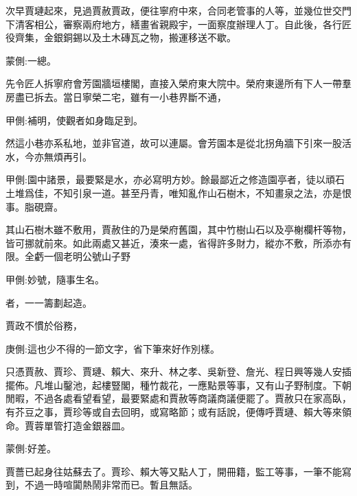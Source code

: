 \begin{parag}
    次早賈璉起來，見過賈赦賈政，便往寧府中來，合同老管事的人等，並幾位世交門下清客相公，審察兩府地方，繕畫省親殿宇，一面察度辦理人丁。自此後，各行匠役齊集，金銀銅錫以及土木磚瓦之物，搬運移送不歇。\begin{note}蒙側:一總。\end{note}先令匠人拆寧府會芳園牆垣樓閣，直接入榮府東大院中。榮府東邊所有下人一帶羣房盡已拆去。當日寧榮二宅，雖有一小巷界斷不通，\begin{note}甲側:補明，使觀者如身臨足到。\end{note}然這小巷亦系私地，並非官道，故可以連屬。會芳園本是從北拐角牆下引來一股活水，今亦無煩再引。\begin{note}甲側:園中諸景，最要緊是水，亦必寫明方妙。餘最鄙近之修造園亭者，徒以頑石土堆爲佳，不知引泉一道。甚至丹青，唯知亂作山石樹木，不知畫泉之法，亦是恨事。脂硯齋。\end{note}其山石樹木雖不敷用，賈赦住的乃是榮府舊園，其中竹樹山石以及亭榭欄杆等物，皆可挪就前來。如此兩處又甚近，湊來一處，省得許多財力，縱亦不敷，所添亦有限。全虧一個老明公號山子野\begin{note}甲側:妙號，隨事生名。\end{note}者，一一籌劃起造。
\end{parag}


\begin{parag}
    賈政不慣於俗務，\begin{note}庚側:這也少不得的一節文字，省下筆來好作別樣。\end{note}只憑賈赦、賈珍、賈璉、賴大、來升、林之孝、吳新登、詹光、程日興等幾人安插擺佈。凡堆山鑿池，起樓豎閣，種竹裁花，一應點景等事，又有山子野制度。下朝閒暇，不過各處看望看望，最要緊處和賈赦等商議商議便罷了。賈赦只在家高臥，有芥豆之事，賈珍等或自去回明，或寫略節；或有話說，便傳呼賈璉、賴大等來領命。賈蓉單管打造金銀器皿。\begin{note}蒙側:好差。\end{note}賈薔已起身往姑蘇去了。賈珍、賴大等又點人丁，開冊籍，監工等事，一筆不能寫到，不過一時喧闐熱鬧非常而已。暫且無話。
\end{parag}


